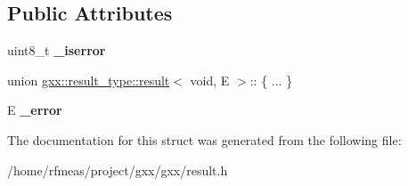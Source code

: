 \subsection*{Public Attributes}
\begin{DoxyCompactItemize}
\item 
uint8\+\_\+t {\bfseries \+\_\+iserror}\hypertarget{structgxx_1_1result__type_1_1result_3_01void_00_01E_01_4_ac32af2bd4739f9030cb33cbd849fc777}{}\label{structgxx_1_1result__type_1_1result_3_01void_00_01E_01_4_ac32af2bd4739f9030cb33cbd849fc777}

\item 
union \hyperlink{classgxx_1_1result__type_1_1result}{gxx\+::result\+\_\+type\+::result}$<$ void, E $>$\+:: \{ ... \}  \hypertarget{structgxx_1_1result__type_1_1result_3_01void_00_01E_01_4_aed322939f4341e3c8ee94065817193ab}{}\label{structgxx_1_1result__type_1_1result_3_01void_00_01E_01_4_aed322939f4341e3c8ee94065817193ab}

\item 
E {\bfseries \+\_\+error}\hypertarget{structgxx_1_1result__type_1_1result_3_01void_00_01E_01_4_af0b4550093a916ed2777157f407f7296}{}\label{structgxx_1_1result__type_1_1result_3_01void_00_01E_01_4_af0b4550093a916ed2777157f407f7296}

\end{DoxyCompactItemize}


The documentation for this struct was generated from the following file\+:\begin{DoxyCompactItemize}
\item 
/home/rfmeas/project/gxx/gxx/result.\+h\end{DoxyCompactItemize}
